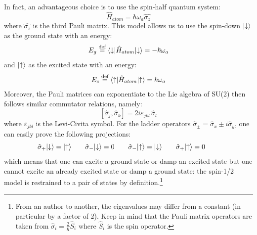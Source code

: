 \documentclass[11pt]{report}
\DeclarePairedDelimiter\bra{\langle}{\rvert}
\DeclarePairedDelimiter\ket{\lvert}{\rangle}
\begin{document}
In fact, an advantageous choice is to use the spin-half quantum system:
\begin{equation}
\hat{H}_{atom} = \hbar \omega_a \hat{\sigma_z}
\end{equation}
where $\hat{\sigma_z}$ is the third Pauli matrix.
This model allows us to use the spin-down $\ket{\downarrow}$ as the ground state with an energy: \begin{equation}
E_g \stackrel{\text{def}}{=} \bra{\downarrow}\hat{H}_{atom}\ket{\downarrow} = -\hbar\omega_a
\end{equation}
and $\ket{\uparrow}$ as the excited state with an energy:
\begin{equation}
E_e \stackrel{\text{def}}{=} \bra{\uparrow}\hat{H}_{atom}\ket{\uparrow} = \hbar\omega_a
\end{equation} Moreover, the Pauli matrices can exponentiate to the Lie algebra of SU(2) then follows similar commutator relations, namely:
\begin{equation}
\label{sigma_commut}
{\displaystyle [\hat{\sigma} _{j},\hat{\sigma} _{k}]=2i\varepsilon _{jkl}\,\hat{\sigma} _{l}}
\end{equation} 
where $\varepsilon _{jkl}$ is the Levi-Civita symbol. For the ladder operators $\hat{\sigma}_{\pm}=\hat{\sigma}_x \pm i\hat{\sigma}_y$, one can easily prove the following projections:
\begin{equation}
\label{sigmapm_rules}
\hat{\sigma}_+ \ket{\downarrow} = \ket{\uparrow} \quad\quad
\hat{\sigma}_- \ket{\downarrow} = 0 \quad\quad
\hat{\sigma}_- \ket{\uparrow} = \ket{\downarrow} \quad\quad
\hat{\sigma}_+ \ket{\uparrow} = 0 \quad\quad
\end{equation}
which means that one can excite a ground state or damp an excited state but one cannot excite an already excited state or damp a ground state: the spin-1/2 model is restrained to a pair of states by definition.\footnote{From an author to another, the eigenvalues may differ from a constant (in particular by a factor of $2$). Keep in mind that the Pauli matrix operators are taken from $\hat{\sigma}_i = \frac{2}{\hbar}\hat{S}_i$ where $\hat{S}_i$ is the spin operator.}
\end{document}
